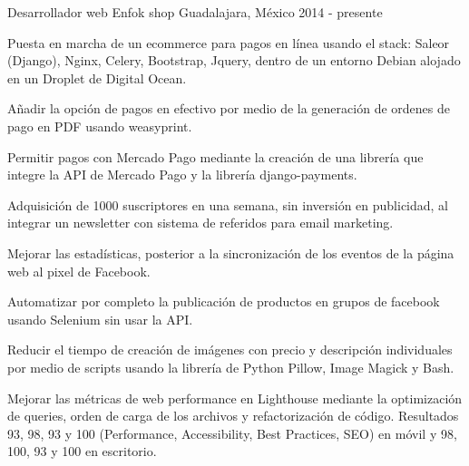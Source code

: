 

\begin{cventries}

  \cventry
    {Desarrollador web}
    {Enfok shop}
    {Guadalajara, México}
    {2014 - presente}
    {
      \begin{cvitems}
        \item {Puesta en marcha de un ecommerce para pagos en línea usando el stack: Saleor (Django), Nginx, Celery, Bootstrap, Jquery, dentro de un entorno Debian alojado en un Droplet de Digital Ocean. }
        \item {Añadir la opción de pagos en efectivo por medio de la generación de ordenes de pago en PDF usando weasyprint. }
        \item {Permitir pagos con Mercado Pago mediante la creación de una librería que integre la API de Mercado Pago y la librería django-payments. }
        \item {Adquisición de 1000 suscriptores en una semana, sin inversión en publicidad, al integrar un newsletter con sistema de referidos para email marketing. }
        \item {Mejorar las estadísticas, posterior a la sincronización de los eventos de la página web al pixel de Facebook.}
        \item {Automatizar por completo la publicación de productos en grupos de facebook usando Selenium sin usar la API. }
        \item {Reducir el tiempo de creación de imágenes con precio y descripción individuales por medio de scripts usando la librería de Python Pillow, Image Magick y Bash.}
        \item {Mejorar las métricas de web performance en Lighthouse mediante la optimización de queries, orden de carga de los archivos y refactorización de código. Resultados 93, 98, 93 y 100 (Performance, Accessibility, Best Practices, SEO) en móvil y 98, 100, 93 y 100 en escritorio.}
      \end{cvitems}
    }


\end{cventries}
